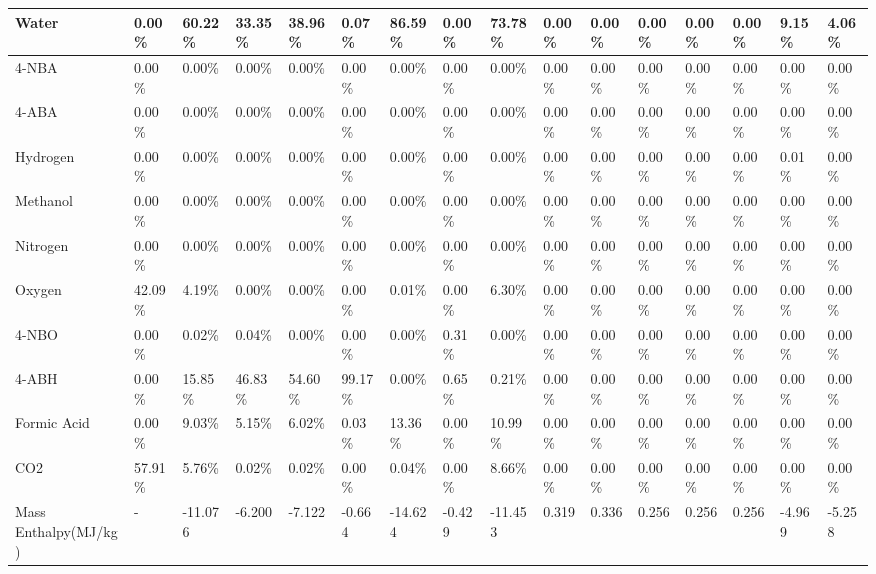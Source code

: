 \begin{landscape}
\begin{table}[H]
\begin{tabular}{|l|l|l|l|l|l|l|l|l|l|l|l|l|l|l|l|}
Water                   & 0.00\%  & 60.22\% & 33.35\% & 38.96\% & 0.07\%  & 86.59\% & 0.00\%  & 73.78\% & 0.00\%  & 0.00\%  & 0.00\%  & 0.00\%  & 0.00\%  & 9.15\%  & 4.06\%  \\ \hline
4-NBA                   & 0.00\%  & 0.00\%  & 0.00\%  & 0.00\%  & 0.00\%  & 0.00\%  & 0.00\%  & 0.00\%  & 0.00\%  & 0.00\%  & 0.00\%  & 0.00\%  & 0.00\%  & 0.00\%  & 0.00\%  \\ \hline
4-ABA                   & 0.00\%  & 0.00\%  & 0.00\%  & 0.00\%  & 0.00\%  & 0.00\%  & 0.00\%  & 0.00\%  & 0.00\%  & 0.00\%  & 0.00\%  & 0.00\%  & 0.00\%  & 0.00\%  & 0.00\%  \\ \hline
Hydrogen                & 0.00\%  & 0.00\%  & 0.00\%  & 0.00\%  & 0.00\%  & 0.00\%  & 0.00\%  & 0.00\%  & 0.00\%  & 0.00\%  & 0.00\%  & 0.00\%  & 0.00\%  & 0.01\%  & 0.00\%  \\ \hline
Methanol                & 0.00\%  & 0.00\%  & 0.00\%  & 0.00\%  & 0.00\%  & 0.00\%  & 0.00\%  & 0.00\%  & 0.00\%  & 0.00\%  & 0.00\%  & 0.00\%  & 0.00\%  & 0.00\%  & 0.00\%  \\ \hline
Nitrogen                & 0.00\%  & 0.00\%  & 0.00\%  & 0.00\%  & 0.00\%  & 0.00\%  & 0.00\%  & 0.00\%  & 0.00\%  & 0.00\%  & 0.00\%  & 0.00\%  & 0.00\%  & 0.00\%  & 0.00\%  \\ \hline
Oxygen                  & 42.09\% & 4.19\%  & 0.00\%  & 0.00\%  & 0.00\%  & 0.01\%  & 0.00\%  & 6.30\%  & 0.00\%  & 0.00\%  & 0.00\%  & 0.00\%  & 0.00\%  & 0.00\%  & 0.00\%  \\ \hline
4-NBO                   & 0.00\%  & 0.02\%  & 0.04\%  & 0.00\%  & 0.00\%  & 0.00\%  & 0.31\%  & 0.00\%  & 0.00\%  & 0.00\%  & 0.00\%  & 0.00\%  & 0.00\%  & 0.00\%  & 0.00\%  \\ \hline
4-ABH                   & 0.00\%  & 15.85\% & 46.83\% & 54.60\% & 99.17\% & 0.00\%  & 0.65\%  & 0.21\%  & 0.00\%  & 0.00\%  & 0.00\%  & 0.00\%  & 0.00\%  & 0.00\%  & 0.00\%  \\ \hline
Formic Acid             & 0.00\%  & 9.03\%  & 5.15\%  & 6.02\%  & 0.03\%  & 13.36\% & 0.00\%  & 10.99\% & 0.00\%  & 0.00\%  & 0.00\%  & 0.00\%  & 0.00\%  & 0.00\%  & 0.00\%  \\ \hline
CO2                     & 57.91\% & 5.76\%  & 0.02\%  & 0.02\%  & 0.00\%  & 0.04\%  & 0.00\%  & 8.66\%  & 0.00\%  & 0.00\%  & 0.00\%  & 0.00\%  & 0.00\%  & 0.00\%  & 0.00\%  \\ \hline
Mass Enthalpy(MJ/kg)    & -       & -11.076 & -6.200  & -7.122  & -0.664  & -14.624 & -0.429  & -11.453 & 0.319   & 0.336   & 0.256   & 0.256   & 0.256   & -4.969  & -5.258  \\ \hline
\end{tabular}
\end{table}

\end{landscape}
